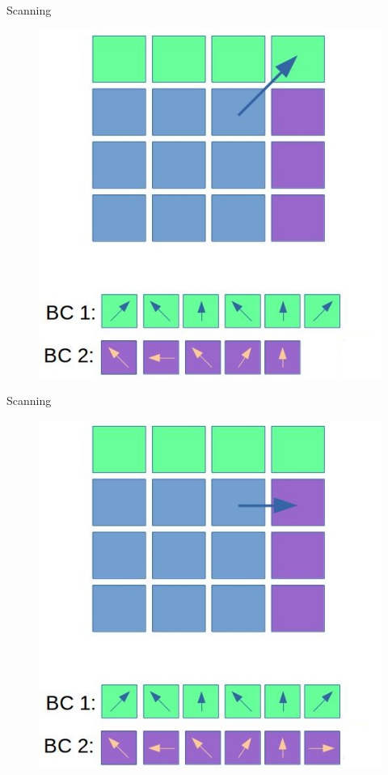 \documentclass[9pt]{beamer}
\begin{document}
\begin{frame}[t]{Scanning}
\begin{figure}
\includegraphics[scale=0.3]{images/scan-5.jpg}
\centering
\end{figure}
\end{frame}

\begin{frame}[t]{Scanning}
\begin{figure}
\includegraphics[scale=0.3]{images/scan-6.jpg}
\centering
\end{figure}
\end{frame}
\end{document}
